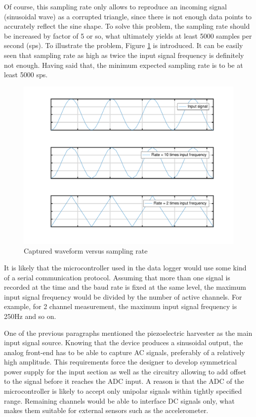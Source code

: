 \documentclass[12pt,a4paper]{article}
\begin{document}
Of course, this sampling rate only allows to reproduce an incoming signal (sinusoidal wave) as a corrupted triangle, since there is not enough data points to accurately reflect the sine shape. To solve this problem, the sampling rate should be increased by factor of 5 or so, what ultimately yields at least 5000 samples per second (sps). To illustrate the problem, Figure \ref{fig:nyquist} is introduced. It can be easily seen that sampling rate as high as twice the input signal frequency is definitely not enough. Having said that, the minimum expected sampling rate is to be at least 5000 sps.
\par

\begin{figure}[h!]
\includegraphics[scale=0.75]{nyquist.pdf}
\caption{Captured waveform versus sampling rate}
\label{fig:nyquist}
\end{figure}

It is likely that the microcontroller used in the data logger would use some kind of a serial communication protocol. Assuming that more than one signal is recorded at the time and the baud rate is fixed at the same level, the maximum input signal frequency would be divided by the number of active channels. For example, for 2 channel measurement, the maximum input signal frequency is 250Hz and so on.
\par

One of the previous paragraphs mentioned the piezoelectric harvester as the main input signal source. Knowing that the device produces a sinusoidal output, the analog front-end has to be able to capture AC signals, preferably of a relatively high amplitude. This requirements force the designer to develop symmetrical power supply for the input section as well as the circuitry allowing to add offset to the signal before it reaches the ADC input. A reason is that the ADC of the microcontroller is likely to accept only unipolar signals within tightly specified range. Remaining channels would be able to interface DC signals only, what makes them suitable for external sensors such as the accelerometer.
\par
\end{document}
